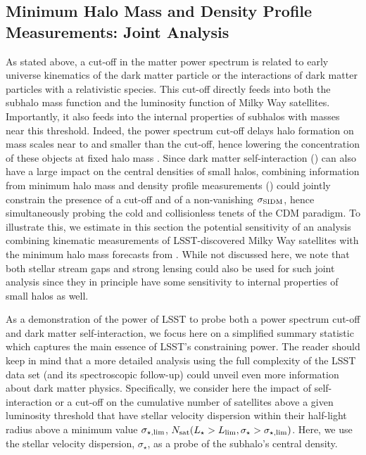\subsection{Minimum Halo Mass and Density Profile Measurements: Joint Analysis   }
\label{sec:combine_probes} 
 
As stated above, a cut-off in the matter power spectrum is related to early universe kinematics of the dark matter particle or the interactions of dark matter particles with a relativistic species. This cut-off directly feeds into both the subhalo mass function and the luminosity function of Milky Way satellites. Importantly, it also feeds into the internal properties of subhalos with masses near this threshold. Indeed, the power spectrum cut-off delays halo formation on mass scales near to and smaller than the cut-off, hence lowering the concentration of these objects at fixed halo mass \citep[\eg,][]{Dunstan:2011bq}. Since dark matter self-interaction () can also have a large impact on the central densities of small halos, combining information from minimum halo mass and density profile measurements () could jointly constrain the presence of a cut-off and of a non-vanishing $\sigma_{\rm SIDM}$, hence simultaneously probing the cold and collisionless tenets of the CDM paradigm. To illustrate this, we estimate in this section the potential sensitivity of an analysis combining kinematic measurements of LSST-discovered Milky Way satellites with the minimum halo mass forecasts from . While not discussed here, we note that both stellar stream gaps and strong lensing could also be used for such joint analysis since they in principle have some sensitivity to internal properties of small halos as well. 

\vspace{1em} 

As a demonstration of the power of LSST to probe both a power spectrum cut-off and dark matter self-interaction, we focus here on a simplified summary statistic which captures the main essence of LSST's constraining power. The reader should keep in mind that a more detailed analysis using the full complexity of the LSST data set (and its spectroscopic follow-up) could unveil even more information about dark matter physics. Specifically, we consider here the impact of self-interaction or a cut-off on the cumulative number of satellites above a given luminosity threshold that have stellar velocity dispersion within their half-light radius above a minimum value $\sigma_{\star,\rm lim}$, $N_{\rm sat}(L_\star>L_{\rm lim}, \sigma_\star> \sigma_{\star,\rm lim})$. Here, we use the stellar velocity dispersion, $\sigma_\star$, as a probe of the subhalo's central density.

